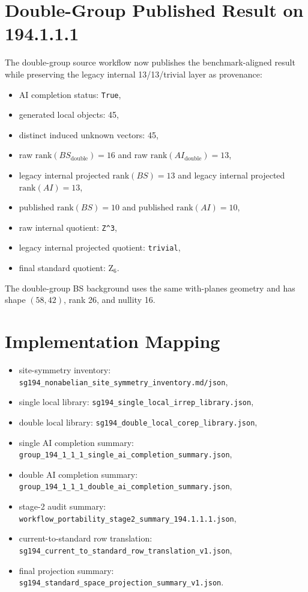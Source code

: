 \documentclass[11pt]{article}
\begin{document}
\section{Double-Group Published Result on 194.1.1.1}
The double-group source workflow now publishes the benchmark-aligned result while preserving the legacy internal 13/13/trivial layer as provenance:
\begin{itemize}
\item AI completion status: \texttt{True},
\item generated local objects: 45,
\item distinct induced unknown vectors: 45,
\item raw $\mathrm{rank}(BS_{\mathrm{double}}) = 16$ and raw $\mathrm{rank}(AI_{\mathrm{double}}) = 13$,
\item legacy internal projected $\mathrm{rank}(BS) = 13$ and legacy internal projected $\mathrm{rank}(AI) = 13$,
\item published $\mathrm{rank}(BS) = 10$ and published $\mathrm{rank}(AI) = 10$,
\item raw internal quotient: \texttt{Z\textasciicircum{}3},
\item legacy internal projected quotient: \texttt{trivial},
\item final standard quotient: $\mathrm{Z}_{6}$.
\end{itemize}
The double-group BS background uses the same with-planes geometry and has shape $(58,42)$, rank 26, and nullity 16.

\section{Implementation Mapping}
\begin{itemize}
\item site-symmetry inventory: \texttt{sg194\_nonabelian\_site\_symmetry\_inventory.md/json},
\item single local library: \texttt{sg194\_single\_local\_irrep\_library.json},
\item double local library: \texttt{sg194\_double\_local\_corep\_library.json},
\item single AI completion summary: \texttt{group\_194\_1\_1\_1\_single\_ai\_completion\_summary.json},
\item double AI completion summary: \texttt{group\_194\_1\_1\_1\_double\_ai\_completion\_summary.json},
\item stage-2 audit summary: \texttt{workflow\_portability\_stage2\_summary\_194.1.1.1.json},
\item current-to-standard row translation: \texttt{sg194\_current\_to\_standard\_row\_translation\_v1.json},
\item final projection summary: \texttt{sg194\_standard\_space\_projection\_summary\_v1.json}.
\end{itemize}
\end{document}
